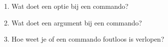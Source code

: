 \begin{enumerate}
\item Wat doet een optie bij een commando?
\item Wat doet een argument bij een commando?
\item Hoe weet je of een commando foutloos is verlopen?
\end{enumerate}
